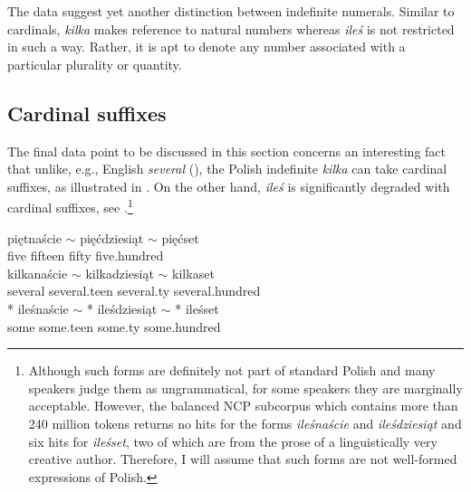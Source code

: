 \documentclass[output=paper,
]{langscibook}
\begin{document}
\noindent The data suggest yet another distinction between indefinite numerals. Similar to cardinals, \textit{kilka} makes reference to natural numbers whereas \textit{ileś} is not restricted in such a way. Rather, it is apt to denote any number associated with a particular plurality or quantity.
	
	\subsection{Cardinal suffixes}\label{sec:cardinal-suffixes}
	
	The final data point to be discussed in this section concerns an interesting fact that unlike, e.g., English \textit{several} (\citealt{kayne2007several}), the Polish indefinite \textit{kilka} can take cardinal suffixes, as illustrated in . On the other hand, \textit{ileś} is significantly degraded with cardinal suffixes, see .\footnote{Although such forms are definitely not part of standard Polish and many speakers judge them as ungrammatical, for some speakers they are marginally acceptable. However, the balanced NCP subcorpus which contains more than 240 million tokens returns no hits for the forms \textit{ileśnaście} and \textit{ileśdziesiąt} and six hits for \textit{ileśset}, two of which are from the prose of a linguistically very creative author. Therefore, I will assume that such forms are not well-formed expressions of Polish.}
    
	
	\ea \label{ex:cardinal-suffixes} \ea {} {{pięt}naście $\sim$} {{pięć}dziesiąt $\sim$} {pięć}set\\
	five fifteen fifty five.hundred\\
	\ex {} {{kilka}naście $\sim$} {{kilka}dziesiąt $\sim$} {kilka}set\label{ex:cardinal-suffixes-kilka} \\
	several several.teen several.ty several.hundred\\
	\ex {} *\hspace{-2pt} {{ileś}naście $\sim$} *\hspace{-2pt} {{ileś}dziesiąt $\sim$} *\hspace{-2pt} {ileś}set\label{ex:cardinal-suffixes-iles} \\
	some {} some.teen {} some.ty {} some.hundred\\
	\z
    \z
\end{document}
